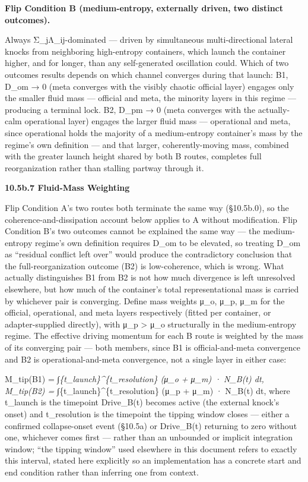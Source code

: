 \documentclass[
]{article}
\begin{document}
\textbf{Flip Condition B (medium-entropy, externally driven, two
distinct outcomes).}

Always Σ\_jΛ\_ij-dominated --- driven by simultaneous multi-directional
lateral knocks from neighboring high-entropy containers, which launch
the container higher, and for longer, than any self-generated
oscillation could. Which of two outcomes results depends on which
channel converges during that launch: B1, D\_om → 0 (meta converges with
the visibly chaotic official layer) engages only the smaller fluid mass
--- official and meta, the minority layers in this regime --- producing
a terminal lock. B2, D\_pm → 0 (meta converges with the actually-calm
operational layer) engages the larger fluid mass --- operational and
meta, since operational holds the majority of a medium-entropy
container's mass by the regime's own definition --- and that larger,
coherently-moving mass, combined with the greater launch height shared
by both B routes, completes full reorganization rather than stalling
partway through it.

\textbf{10.5b.7 Fluid-Mass Weighting}

Flip Condition A's two routes both terminate the same way (§10.5b.0), so
the coherence-and-dissipation account below applies to A without
modification. Flip Condition B's two outcomes cannot be explained the
same way --- the medium-entropy regime's own definition requires D\_om
to be elevated, so treating D\_om as ``residual conflict left over''
would produce the contradictory conclusion that the full-reorganization
outcome (B2) is low-coherence, which is wrong. What actually
distinguishes B1 from B2 is not how much divergence is left unresolved
elsewhere, but how much of the container's total representational mass
is carried by whichever pair is converging. Define mass weights μ\_o,
μ\_p, μ\_m for the official, operational, and meta layers respectively
(fitted per container, or adapter-supplied directly), with μ\_p
\textgreater{} μ\_o structurally in the medium-entropy regime. The
effective driving momentum for each B route is weighted by the mass of
its converging pair --- both members, since B1 is official-and-meta
convergence and B2 is operational-and-meta convergence, not a single
layer in either case:

M\_tip(B1) = ∫\emph{\{t\_launch\}\^{}\{t\_resolution\} (μ\_o + μ\_m) ·
N\_B(t) dt, M\_tip(B2) = ∫}\{t\_launch\}\^{}\{t\_resolution\} (μ\_p +
μ\_m) · N\_B(t) dt, where t\_launch is the timepoint Drive\_B(t) becomes
active (the external knock's onset) and t\_resolution is the timepoint
the tipping window closes --- either a confirmed collapse-onset event
(§10.5a) or Drive\_B(t) returning to zero without one, whichever comes
first --- rather than an unbounded or implicit integration window; ``the
tipping window'' used elsewhere in this document refers to exactly this
interval, stated here explicitly so an implementation has a concrete
start and end condition rather than inferring one from context.
\end{document}
